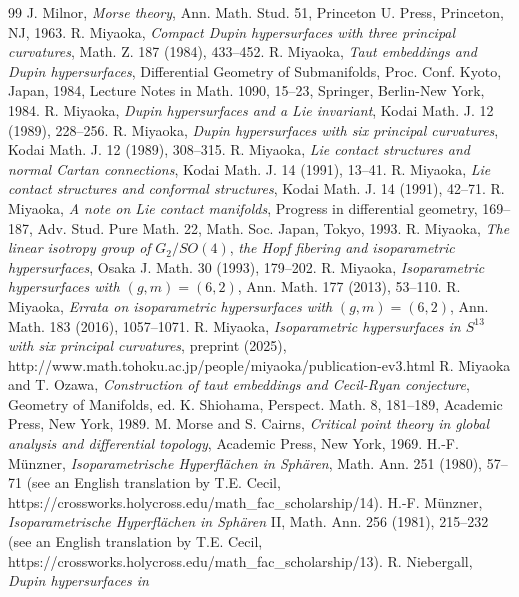 \documentclass[12pt]{article}
\begin{document}
{\begin{thebibliography}{99}
J. Milnor, {\em Morse theory}, Ann. Math. Stud. 51,
Princeton U. Press, Princeton, NJ, 1963.
 R. Miyaoka, {\em Compact Dupin hypersurfaces
with three principal curvatures}, Math. Z. 187 (1984),
433--452.
 R. Miyaoka, {\em Taut embeddings
and Dupin hypersurfaces}, Differential Geometry of Submanifolds,
Proc. Conf. Kyoto, Japan, 1984, Lecture Notes in Math. 1090, 15--23,
Springer, Berlin-New York, 1984.
 R. Miyaoka,
{\em Dupin hypersurfaces and
a Lie invariant}, Kodai Math. J. 12 (1989), 228--256.
 R. Miyaoka,
{\em Dupin hypersurfaces with
six principal curvatures}, Kodai Math. J. 12 (1989), 
308--315.
 R. Miyaoka, 
{\em Lie contact structures and normal Cartan connections}, Kodai Math. J. 14 (1991), 13--41.
 R. Miyaoka, {\em Lie contact structures
and conformal
structures}, Kodai Math. J. 14 (1991), 42--71.
 R. Miyaoka, {\em A note on Lie
contact manifolds}, Progress in differential geometry, 169--187,
Adv. Stud. Pure Math. 22, Math. Soc. Japan, Tokyo, 1993.
 R. Miyaoka, {\em The linear isotropy
group of} $G_2/SO(4)$, {\em the Hopf fibering and isoparametric
hypersurfaces}, Osaka J. Math. 30 (1993), 179--202.
 R. Miyaoka, {\em Isoparametric hypersurfaces with $(g,m) = (6,2)$},
Ann. Math. 177 (2013), 53--110.
 R. Miyaoka, {\em Errata on isoparametric hypersurfaces with} $(g,m) = (6,2)$,
Ann. Math. 183 (2016), 1057--1071.
 R. Miyaoka, {\em Isoparametric hypersurfaces in $S^{13}$ with six principal curvatures},
preprint (2025),\\
http://www.math.tohoku.ac.jp/people/miyaoka/publication-ev3.html
 R. Miyaoka and T. Ozawa, {\em Construction of taut
embeddings and Cecil-Ryan conjecture}, Geometry of Manifolds,
ed. K. Shiohama, Perspect. Math. 8, 181--189,
Academic Press, New York, 1989.
M. Morse and S. Cairns, {\em Critical point theory
in global analysis and differential topology}, Academic Press,
New York, 1969.
 H.-F. M\"{u}nzner, {\em Isoparametrische Hyperfl\"{a}chen
in Sph\"{a}ren}, Math. Ann. 251 (1980), 57--71 (see an English translation by T.E. Cecil, 
https://crossworks.holycross.edu/math\_fac\_scholarship/14).
  H.-F. M\"{u}nzner, {\em Isoparametrische Hyperfl\"{a}chen
in Sph\"{a}ren} II, Math. Ann.  256 (1981), 215--232   (see  an English translation by T.E. Cecil, 
\\https://crossworks.holycross.edu/math\_fac\_scholarship/13).
 R. Niebergall, {\em Dupin hypersurfaces in
}
\end{thebibliography}}
\end{document}
